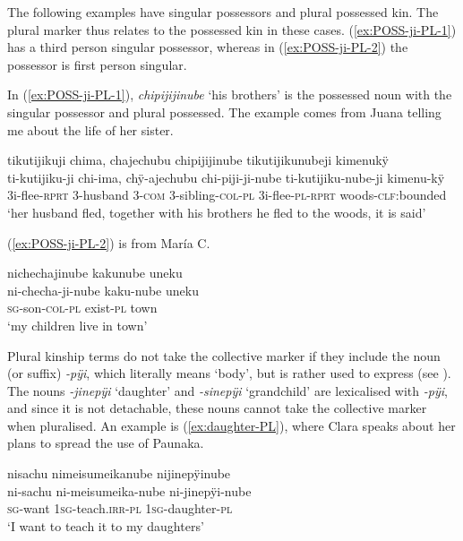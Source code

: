 The following examples have singular possessors and plural possessed kin. The plural marker thus relates to the possessed kin in these cases. (\ref{ex:POSS-ji-PL-1}) has a third person singular possessor, whereas in (\ref{ex:POSS-ji-PL-2}) the possessor is first person singular.

In (\ref{ex:POSS-ji-PL-1}), \textit{chipijijinube} ‘his brothers’ is the possessed noun with the singular possessor and plural possessed. The example comes from Juana telling me about the life of her sister.

\ea\label{ex:POSS-ji-PL-1}
\begingl
\glpreamble tikutijikuji chima, chajechubu chipijijinube tikutijikunubeji kimenukÿ \\
\gla ti-kutijiku-ji chi-ima, chÿ-ajechubu chi-piji-ji-nube ti-kutijiku-nube-ji kimenu-kÿ \\
\glb 3i-flee-\textsc{rprt} 3-husband 3-\textsc{com} 3-sibling-\textsc{col}-\textsc{pl} 3i-flee-\textsc{pl}-\textsc{rprt} woods-\textsc{clf:}bounded\\
\glft  ‘her husband fled, together with his brothers he fled to the woods, it is said’
\endgl
\trailingcitation{[jxx-p120430l-2.086-087]}
\xe

(\ref{ex:POSS-ji-PL-2}) is from María C.

\ea\label{ex:POSS-ji-PL-2}
\begingl 
\glpreamble nichechajinube kakunube uneku\\
\gla ni-checha-ji-nube kaku-nube uneku\\ 
\textsc{sg}-son-\textsc{col}-\textsc{pl} exist-\textsc{pl} town\\ 
\glft ‘my children live in town’
\trailingcitation{[uxx-p110825l.075]}
\xe
{}


Plural kinship terms do not take the collective marker if they include the noun (or suffix) \textit{-pÿi}, which literally means ‘body’, but is rather used to express  (see ). The nouns \textit{-jinepÿi} ‘daughter’ and \textit{-sinepÿi} ‘grandchild’ are lexicalised with \textit{-pÿi}, and since it is not detachable, these nouns cannot take the collective marker when pluralised. An example is (\ref{ex:daughter-PL}), where Clara speaks about her plans to spread the use of Paunaka.

\ea\label{ex:daughter-PL}
\begingl 
\glpreamble nisachu nimeisumeikanube nijinepÿinube\\
\gla ni-sachu ni-meisumeika-nube ni-jinepÿi-nube\\ 
\textsc{sg}-want 1\textsc{sg}-teach.\textsc{irr}-\textsc{pl} 1\textsc{sg}-daughter-\textsc{pl}\\ 
\glft ‘I want to teach it to my daughters’
\trailingcitation{[cux-c120414ls-2.323]}
\xe

